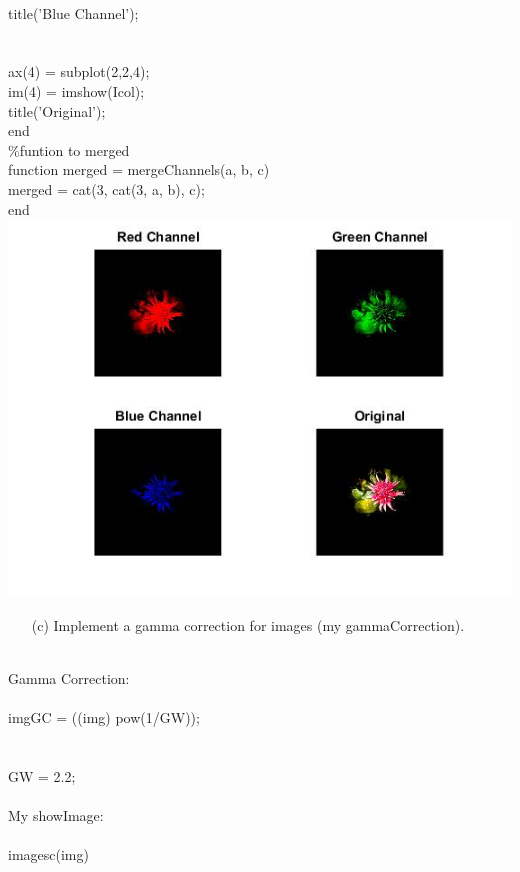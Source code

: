 {        \\ title({'Blue Channel'});
        \\ \ \\
        \\ ax(4) = subplot(2,2,4);
        \\ im(4) = imshow(Icol);
        \\ title({'Original'});
        \\ end
        \\ \%funtion to merged
        \\ function merged = mergeChannels(a, b, c)
        \\    merged = cat(3, cat(3, a, b), c);
        \\ end
        \\ \includegraphics[scale=0.75]{images/SolutionSecPart.jpg} 
        }
\pagebreak
    \begin{enumerate}        
        \item[(c)] Implement a gamma correction for images (my gammaCorrection).
        \\
    \end{enumerate}
        \\
        Gamma Correction:
        \\ \ \\ imgGC = ((img) pow(1/GW));
        \\ \ \\
        \\ GW = 2.2; 
        \\ \     \\
        My showImage:
        \\ \ \\ imagesc(img)
